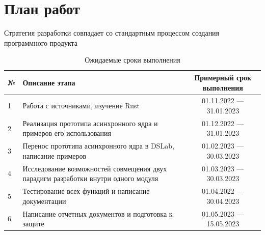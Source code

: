 \section{План работ}

Стратегия разработки совпадает со стандартным процессом создания программного продукта 

\begin{table}[!h]
	\centering
\begin{tabular}{|l|p{27em}|c|}
	\hline
№	& Описание этапа &  Примерный срок выполнения \\
	\hline
	1 & Работа с источниками, изучение Rust &  01.11.2022 --- 31.01.2023\\ 
	\hline
2 & Реализация прототипа асинхронного ядра и примеров его использования & 01.12.2022 --- 31.01.2023 \\
	\hline
3	& Перенос прототипа асинхронного ядра в DSLab, написание примеров &  01.02.2023 --- 30.03.2023 \\
\hline
4	& Исследование возможностей совмещения двух парадигм разработки внутри одного модуля &  01.03.2023 --- 30.03.2023 \\
	\hline
5	& Тестирование всех функций и написание документации &  01.04.2022 --- 30.04.2023  \\
	\hline
6	& Написание отчетных документов и подготовка к защите & 01.05.2023 --- 15.05.2023 \\
	\hline
\end{tabular}
	\caption{Ожидаемые сроки выполнения}
	\label{table1}
\end{table}

